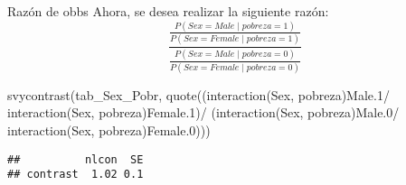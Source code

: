 \documentclass[
  ignorenonframetext,
]{beamer}
\newenvironment{Shaded}{\begin{snugshade}}{\end{snugshade}}
\newcommand{\AttributeTok}[1]{\textcolor[rgb]{0.77,0.63,0.00}{#1}}
\newcommand{\FunctionTok}[1]{\textcolor[rgb]{0.00,0.00,0.00}{#1}}
\newcommand{\NormalTok}[1]{#1}
\newcommand{\SpecialCharTok}[1]{\textcolor[rgb]{0.00,0.00,0.00}{#1}}
\newcommand{\StringTok}[1]{\textcolor[rgb]{0.31,0.60,0.02}{#1}}
\begin{document}
\begin{frame}[fragile]{Razón de obbs}
\protect\hypertarget{razuxf3n-de-obbs-3}{}
Ahora, se desea realizar la siguiente razón: \[
 \frac{\frac{P(Sex = Male \mid pobreza = 1 )}{P(Sex = Female \mid pobreza = 1 )}}{
 \frac{P(Sex = Male \mid pobreza = 0 )}{P(Sex = Female \mid pobreza = 0 )}
 }
\] \footnotesize

\begin{Shaded}
\begin{Highlighting}[]
\FunctionTok{svycontrast}\NormalTok{(tab\_Sex\_Pobr, }
            \FunctionTok{quote}\NormalTok{((}\StringTok{\textasciigrave{}}\AttributeTok{interaction(Sex, pobreza)Male.1}\StringTok{\textasciigrave{}}\SpecialCharTok{/}
                     \StringTok{\textasciigrave{}}\AttributeTok{interaction(Sex, pobreza)Female.1}\StringTok{\textasciigrave{}}\NormalTok{)}\SpecialCharTok{/}
\NormalTok{                  (}\StringTok{\textasciigrave{}}\AttributeTok{interaction(Sex, pobreza)Male.0}\StringTok{\textasciigrave{}}\SpecialCharTok{/}
                   \StringTok{\textasciigrave{}}\AttributeTok{interaction(Sex, pobreza)Female.0}\StringTok{\textasciigrave{}}\NormalTok{)))}
\end{Highlighting}
\end{Shaded}

\begin{verbatim}
##          nlcon  SE
## contrast  1.02 0.1
\end{verbatim}
\end{frame}
\end{document}
